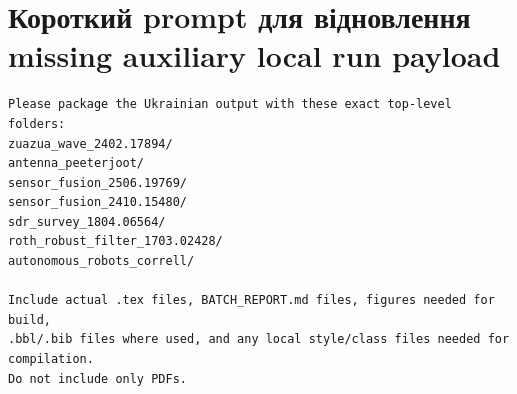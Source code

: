 \section{Короткий prompt для відновлення missing auxiliary local run payload}

\begin{lstlisting}
Please package the Ukrainian output with these exact top-level folders:
zuazua_wave_2402.17894/
antenna_peeterjoot/
sensor_fusion_2506.19769/
sensor_fusion_2410.15480/
sdr_survey_1804.06564/
roth_robust_filter_1703.02428/
autonomous_robots_correll/

Include actual .tex files, BATCH_REPORT.md files, figures needed for build,
.bbl/.bib files where used, and any local style/class files needed for compilation.
Do not include only PDFs.
\end{lstlisting}
